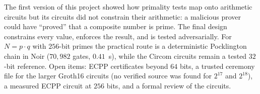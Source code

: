\documentclass[12pt]{article}
\begin{document}
The first version of this project showed how primality tests map onto arithmetic circuits but its circuits did not constrain their arithmetic: a malicious prover could have ``proved'' that a composite number is prime. The final design constrains every value, enforces the result, and is tested adversarially. For $N = p\cdot q$ with $256$-bit primes the practical route is a deterministic Pocklington chain in Noir ($70{,}982$ gates, $0.41$~s), while the Circom circuits remain a tested $32$-bit reference. Open items: ECPP certificates beyond $64$ bits, a trusted ceremony file for the larger Groth16 circuits (no verified source was found for $2^{17}$ and $2^{18}$), a measured ECPP circuit at $256$ bits, and a formal review of the circuits.
\end{document}
